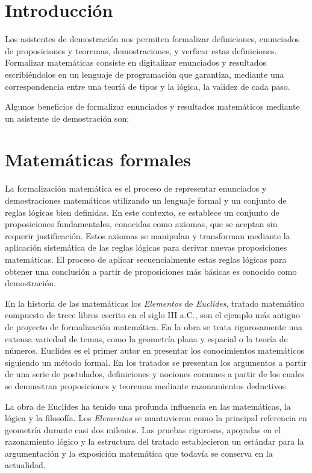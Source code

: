 
\section*{Introducción}

Los asistentes de demostración nos permiten formalizar definiciones, enunciados
de proposiciones y teoremas, demostraciones, y verficar estas definiciones.
Formalizar matemáticas consiste en digitalizar enunciados y resultados
escribiéndolos en un lenguaje de programación que garantiza, mediante una
correspondencia entre una teoríá de tipos y la lógica, la validez de cada paso.

Algunos beneficios de formalizar enunciados y resultados matemáticos mediante un
asistente de demostración son:

\newpage

\section{Matemáticas formales}

La formalización matemática es el proceso de representar enunciados y
demostraciones matemáticas utilizando un lenguaje formal y un conjunto de reglas
lógicas bien definidas. En este contexto, se establece un conjunto de
proposiciones fundamentales, conocidas como axiomas, que se aceptan sin requerir
justificación. Estos axiomas se manipulan y transforman mediante la aplicación
sistemática de las reglas lógicas para derivar nuevas proposiciones matemáticas.
El proceso de aplicar secuencialmente estas reglas lógicas para obtener una
conclusión a partir de proposiciones más básicas es conocido como demostración.


En la historia de las matemáticas los \textit{Elementos} de \textit{Euclides},
tratado matemático compuesto de trece libros escrito en el siglo III a.C., son
el ejemplo más antiguo de proyecto de formalización matemática. En la obra se
trata rigurosamente una extensa variedad de temas, como la geometría plana y
espacial o la teoría de números. Euclides es el primer autor en presentar los
conocimientos matemáticos siguiendo un método formal. En los tratados se
presentan los argumentos a partir de una serie de postulados, definiciones y
nociones comunes a partir de los cuales se demuestran proposiciones y teoremas
mediante razonamientos deductivos.

La obra de Euclides ha tenido una profunda influencia en las matemáticas, la
lógica y la filosofía. Los \textit{Elementos} se mantuvieron como la principal
referencia en geometría durante casi dos milenios. Las pruebas rigurosas,
apoyadas en el razonamiento lógico y la estructura del tratado establecieron un
estándar para la argumentación y la exposición matemática que todavía se
conserva en la actualidad.

